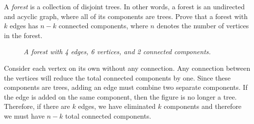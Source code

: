 \documentclass{article}
\begin{document}
\begin{question}
A {\em forest} is a collection of disjoint trees. In other words, a forest is an undirected and acyclic graph, where all of its components are trees. Prove that a forest with $k$ edges has $n - k$ connected components, where $n$ denotes the number of vertices in the forest.

\begin{figure}[H]
    \centering
    \caption{{\em A forest with 4 edges, 6 vertices, and 2 connected components.}}
\end{figure}
\end{question}

\begin{solution}
Consider each vertex on its own without any connection. Any connection between the vertices will reduce the total connected components by one. Since these components are trees, adding an edge must combine two separate components. If the edge is added on the same component, then the figure is no longer a tree. Therefore, if there are $k$ edges, we have eliminated $k$ components and therefore we must have $n - k$ total connected components.
\end{solution}
\end{document}

